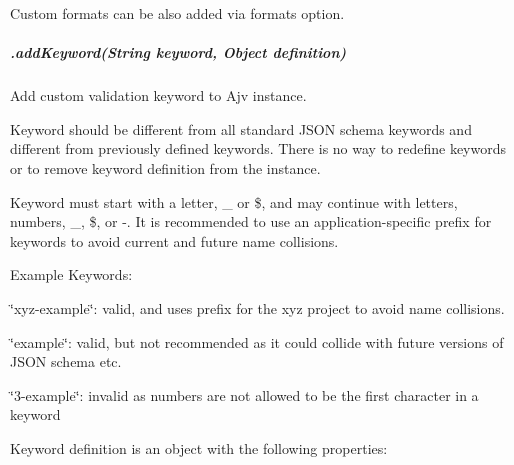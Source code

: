Custom formats can be also added via {\ttfamily formats} option.

\subparagraph*{\label{_api-addkeyword}%
.add\+Keyword(\+String keyword, Object definition)}

Add custom validation keyword to Ajv instance.

Keyword should be different from all standard J\+S\+ON schema keywords and different from previously defined keywords. There is no way to redefine keywords or to remove keyword definition from the instance.

Keyword must start with a letter, {\ttfamily \+\_\+} or {\ttfamily \$}, and may continue with letters, numbers, {\ttfamily \+\_\+}, {\ttfamily \$}, or {\ttfamily -\/}. It is recommended to use an application-\/specific prefix for keywords to avoid current and future name collisions.

Example Keywords\+:
\begin{DoxyItemize}
\item {\ttfamily \char`\"{}xyz-\/example\char`\"{}}\+: valid, and uses prefix for the xyz project to avoid name collisions.
\item {\ttfamily \char`\"{}example\char`\"{}}\+: valid, but not recommended as it could collide with future versions of J\+S\+ON schema etc.
\item {\ttfamily \char`\"{}3-\/example\char`\"{}}\+: invalid as numbers are not allowed to be the first character in a keyword
\end{DoxyItemize}

Keyword definition is an object with the following properties\+:



